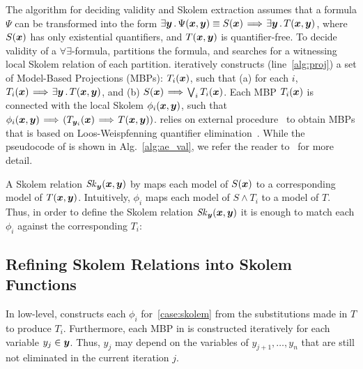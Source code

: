 The algorithm \aeval for deciding validity and Skolem extraction assumes that a formula $\Psi$ can be transformed
into the form ${\exists \vy \such \Psi(\vx, \vy)} \equiv {S(\vx)
  \!\implies\! \exists \vy \such T(\vx,\vy)}$, where $S(\vx)$ has only
existential quantifiers, and $T(\vx, \vy)$ is quantifier-free.
%
To decide validity of a $\forall\exists$-formula, \aeval partitions
the formula, and searches for a witnessing local Skolem relation of
each partition.  \aeval iteratively constructs (line~\ref{alg:proj}) a set of Model-Based
Projections (MBPs): $T_i(\vx)$, such that (a) for each $i$,
$T_i(\vx) \!\implies\! \exists \vy \such T (\vx, \vy)$, and (b)
$S(\vx) \!\implies\! \Lor_i T_i(\vx)$.  Each MBP
$T_i(\vx)$ is connected with the local Skolem $\phi_i(\vx,\vy)$, such that
$\phi_i(\vx,\vy) \!\implies\! (T_{\vy_i}(\vx) \!\implies\!
  T(\vx,\vy))$.  \aeval relies on external
procedure~\cite{komuravelli2014smt,Dutertre} to obtain MBPs that is
based on Loos-Weispfenning quantifier
elimination~\cite{loos1993applying}.
While the pseudocode of \aeval is shown in Alg.~\ref{alg:ae_val}, we refer the reader to~\cite{fedyukovich2015automated} for
more detail.%


A Skolem relation
${\mathit{Sk}_{\vy} (\vx, \vy)}$ by \aeval maps each
model of $S(\vx)$ to a corresponding model of $T(\vx,\vy)$.
Intuitively, $\phi_i$ maps each model of $S \land T_{i}$ to a model of $T$.
Thus, in order to define the  Skolem relation $\mathit{Sk}_{\vy}(\vx, \vy)$ it is enough to 
match each $\phi_i$ against the corresponding $T_{i}$:%
%
\skolemcases


\subsection{Refining Skolem Relations into Skolem Functions}
\label{sec:new}

\localfactoralg

In low-level, \aeval constructs each $\phi_i$ for~\eqref{case:skolem} from the substitutions made in $T$ to produce $T_{i}$.
Furthermore, 
%
each MBP in \aeval is constructed iteratively for each variable $y_j \in \vy$.
Thus, $y_j$ may depend on the variables of $y_{j+1},\ldots, y_{n}$ that are still not eliminated in the current iteration $j$.

